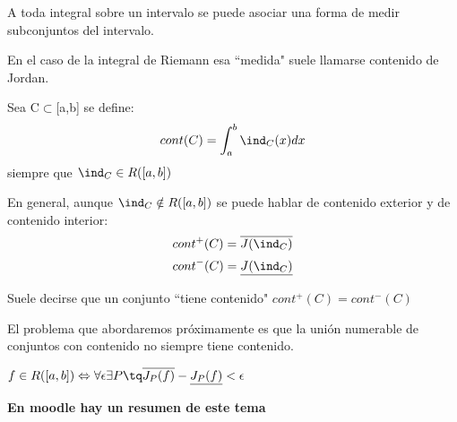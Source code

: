 \documentclass{apuntes}
\begin{document}
\begin{defn}[Contenido]
A toda integral sobre un intervalo se puede asociar una forma de medir subconjuntos del intervalo.

En el caso de la integral de Riemann esa ``medida" suele llamarse contenido de Jordan.

Sea C$\subset$[a,b] se define:
\[cont(C) = \int_a^b \ind_{C}(x) dx\]
siempre que $\ind_C \in R([a,b])$

En general, aunque $\ind_C \notin R([a,b])$ se puede hablar de contenido exterior y de contenido interior:
\[cont^+(C)=\overline{J(\ind_C)}\]
\[cont^-(C)=\underline{J(\ind_C)}\]

Suele decirse que un conjunto ``tiene contenido" $cont^+(C)=cont^-(C)$
\end{defn}

El problema que abordaremos próximamente es que la unión numerable de conjuntos con contenido no siempre tiene contenido.

\obs $f\in R([a,b]) \Leftrightarrow \forall \epsilon \exists P \tq \overline{J_P(f)}-\underline{J_P(f)} < \epsilon$


\textbf{En moodle hay un resumen de este tema}
\end{document}
